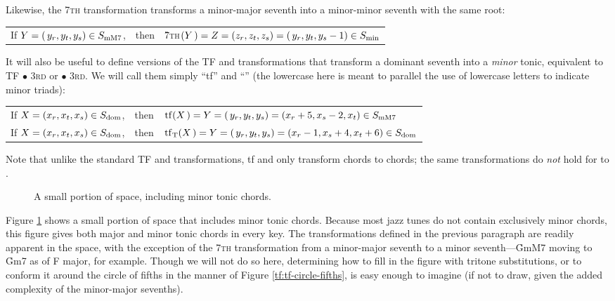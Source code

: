 \noindent Likewise, the \textsc{7th} transformation transforms a
minor-major seventh into a minor-minor seventh with the same root:

\vspace{.5\baselineskip}
\begin{tabular}{lcl}
  If $Y = (\,y_r, y_t, y_s) \in S_{\mathrm{mM7}}$, & then &
    \h{7}\textsc{th}$(Y\,) = Z = (z_r, z_t, z_s)=(\,y_r, y_t, y_s-1) \in S_{\mathrm{min}}$
\end{tabular}
\vspace{.5\baselineskip}

\noindent It will also be useful to define versions of the TF and \tft
transformations that transform a dominant seventh into a \emph{minor} tonic,
equivalent to TF $\bullet$ \textsc{3rd} or \tft $\bullet$ \textsc{3rd}. We will
call them simply ``tf'' and ``\tfmt'' (the lowercase here is meant to parallel
the use of lowercase letters to indicate minor triads): \\
%
\vspace{0.5\baselineskip}
\begin{tabular}{lcl}
  If $X = (x_r, x_t, x_s) \in S_{\mathrm{dom}}$, & then &
    $\mathrm{tf}(X\,) = Y = (\,y_r, y_t, y_s) = (x_r + 5, x_s - 2, x_t) \in S_{\mathrm{mM7}}$ \\
%
  If $X = (x_r, x_t, x_s) \in S_{\mathrm{dom}}$, & then &
    $\mathrm{tf}_\mathrm{T}(X\,) = Y = (\,y_r, y_t, y_s) = (x_r - 1, x_s + 4,
                                               x_t + 6) \in S_{\mathrm{dom}}$ \\
\end{tabular}
\vspace{0.5\baselineskip}

\noindent Note that unlike the standard TF and \tft transformations, tf and
\tfmt only transform \V chords to \I chords; the same
transformations do \emph{not} hold for \ii to \V.

\begin{figure}[tbp]
  \caption{A small portion of \tf space, including minor tonic chords.}
  \label{tfe:tf-minor-tonics}
\end{figure}

Figure \ref{tfe:tf-minor-tonics} shows a small portion of \tf space that
includes minor tonic chords. Because most jazz tunes do not contain
exclusively minor chords, this figure gives both major and minor tonic chords
in every key. The transformations defined in the previous paragraph are
readily apparent in the space, with the exception of the \textsc{7th}
transformation from a minor-major seventh to a minor seventh---\h{GmM7} moving
to \h{Gm7} as \ii of F major, for example. Though we will not do so
here, determining how to fill in the figure with tritone substitutions, or to
conform it around the circle of fifths in the manner of Figure
\ref{tf:tf-circle-fifths}, is easy enough to imagine (if not to draw, given
the added complexity of the minor-major sevenths).

